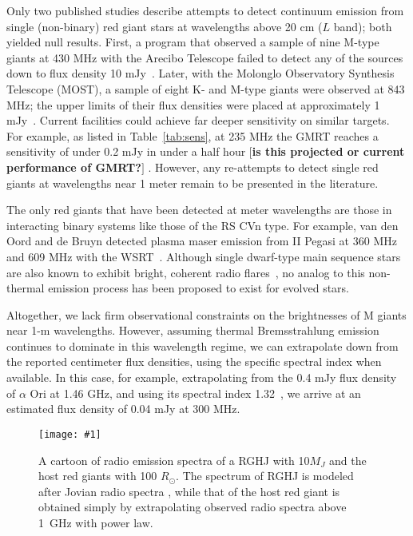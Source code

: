 \documentclass{emulateapj}
\def\memoNZ#1{\color{green}$[${\bf #1}$]$ \color{black}}
\def\plotonesc#1{\centering \leavevmode
\texttt{[image: \#1]}}
\begin{document}
Only two published studies describe attempts to detect continuum emission from single (non-binary) red giant stars at wavelengths above 20 cm ($L$ band); both yielded null results.
First, a program that observed a sample of nine M-type giants at 430 MHz with the Arecibo Telescope failed to detect any of the sources down to flux density 10 mJy~\citep{Fix1976}.
Later, with the Molonglo Observatory Synthesis Telescope (MOST), a sample of eight K- and M-type giants were observed at 843 MHz; the upper limits of their flux densities were placed at approximately 1 mJy~\citep{Beasley1992}.
Current facilities could achieve far deeper sensitivity on similar targets.
For example, as listed in Table~\ref{tab:sens}, at 235 MHz the GMRT reaches a sensitivity of under 0.2 mJy in under a half hour \memoNZ{is this projected or current performance of GMRT?}.
However, any re-attempts to detect single red giants at wavelengths near 1 meter remain to be presented in the literature.

The only red giants that have been detected at meter wavelengths are those in interacting binary systems like those of the RS CVn type.
For example, van den Oord and de Bruyn detected plasma maser emission from II Pegasi at 360 MHz and 609 MHz with the WSRT~\citep{vandenOord1994}.
Although single dwarf-type main sequence stars are also known to exhibit bright, coherent radio flares~\citep{Bastian1990}, no analog to this non-thermal emission process has been proposed to exist for evolved stars.

Altogether, we lack firm observational constraints on the brightnesses of M giants near 1-m wavelengths.
However, assuming thermal Bremsstrahlung emission continues to dominate in this wavelength regime, we can extrapolate down from the reported centimeter flux densities, using the specific spectral index when available.
In this case, for example, extrapolating from the 0.4 mJy flux density of $\alpha$ Ori at 1.46 GHz, and using its spectral index 1.32~\citep{Newell1982}, we arrive at an estimated flux density of 0.04 mJy at 300 MHz.


\begin{figure*}[tbp]
   \plotonesc{cartoon2.pdf}
   \caption{A cartoon of radio emission spectra of a RGHJ with 10$M_J$ and the host red giants with 100 $R_{\odot }$. The spectrum of RGHJ is modeled after Jovian radio spectra \citep[e.g.][]{zarka_et_al2004}, while that of the host red giant is obtained simply by extrapolating observed radio spectra above 1~GHz with power law. }
  \label{fig:cartoon}
\end{figure*}
\end{document}
